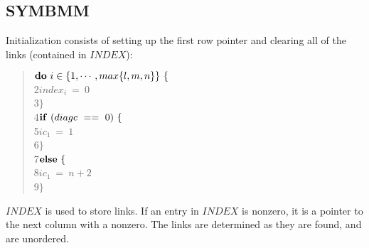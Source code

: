 \subsection{SYMBMM}
 
Initialization consists of setting up the first row pointer and clearing all
of the links (contained in $INDEX$):
\begin{quote}\hspace*{ 4em}$  {\bf do}\ i\in\{1,\cdots,max\{l,m,n\}\}\ \{ $ \\
 2\hspace*{ 8em}$      index_{i}\ =\ 0 $ \\
 3\hspace*{ 8em}$      \} $ \\
 4\hspace*{ 4em}$  {\bf if}\ (diagc\ ==\ 0)\ \{ $ \\
 5\hspace*{ 8em}$      ic_{1}\ =\ 1 $ \\
 6\hspace*{ 8em}$      \} $ \\
 7\hspace*{ 4em}$  {\bf else}\ \{ $ \\
 8\hspace*{ 8em}$      ic_{1}\ =\ n+2 $ \\
 9\hspace*{ 8em}$      \} $
\end{quote}
$INDEX$ is used to store links.  If an entry in $INDEX$ is nonzero, it is
a pointer to the next column with a nonzero.  The links are determined as
they are found, and are unordered.

